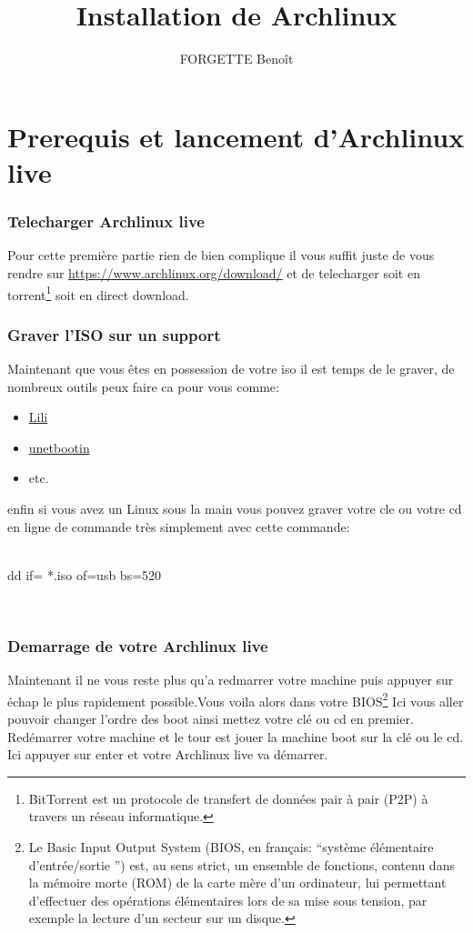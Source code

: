\documentclass[a4paper]{book}
\newenvironment{codebox}{
    \itshape
    \small
      \\
  \begin{lrbox}{
    \mybox
  }
  \begin{minipage}{1\textwidth}}{
    \end{minipage}
  \end{lrbox}
  \fcolorbox{black}{lightgray}{\usebox{\mybox}}
  \\
}
\begin{document}
\title{Installation de Archlinux}
\author{FORGETTE Benoît}
\maketitle


\tableofcontents
\part{Prerequis et lancement d'Archlinux live}
\section{Telecharger Archlinux live}
Pour cette première partie rien de bien complique il vous suffit juste de
vous rendre sur \url{https://www.archlinux.org/download/} et de telecharger
soit en torrent\footnote{BitTorrent est un protocole de transfert de données 
pair à pair (P2P) à travers un réseau informatique.}
soit en direct download.
\section{Graver l'ISO sur un support}
Maintenant que vous êtes en possession de votre iso il est temps de le
graver, de nombreux outils peux faire ca pour vous comme\@:
\begin{itemize} 
  \item \href{http://www.linuxliveusb.com/fr/download}{Lili}
  \item \href{https://unetbootin.github.io/}{unetbootin}
  \item etc.
\end{itemize}
enfin si vous avez un Linux sous la main vous pouvez graver votre cle ou
votre cd en ligne de commande très simplement avec cette commande\@:\\
\begin{codebox}
  dd if= *.iso of=usb bs=520
\end{codebox}
\section{Demarrage de votre Archlinux live}
Maintenant il ne vous reste plus qu'a redmarrer votre machine puis appuyer
sur \'echap le plus rapidement possible.Vous voila alors dans votre
BIOS\footnote{Le Basic Input Output System (BIOS, en français:
  ``système élémentaire d'entrée/sortie '') est, au sens strict, un ensemble de
  fonctions, contenu dans la mémoire morte (ROM) de la carte mère d'un
  ordinateur, lui permettant d'effectuer des opérations élémentaires lors de sa
mise sous tension, par exemple la lecture d'un secteur sur un disque.}
Ici vous aller pouvoir changer l'ordre des boot ainsi mettez votre cl\'e ou
cd en premier.\\
Red\'emarrer votre machine et le tour est jouer la machine boot sur la cl\'e ou
le cd.
Ici appuyer sur enter et votre Archlinux live va d\'emarrer.\\
\end{document}

